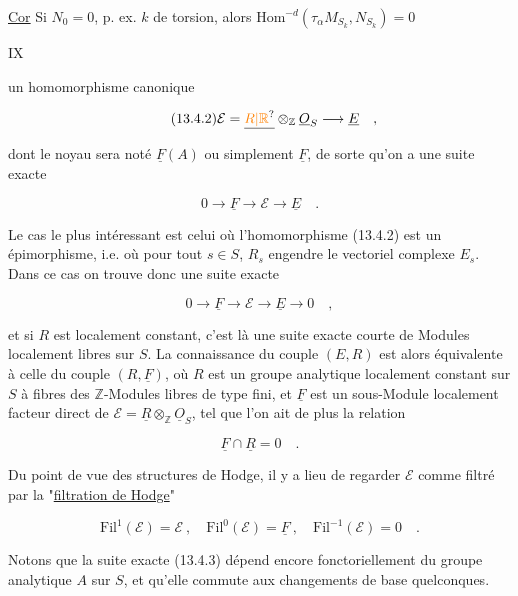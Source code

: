 \uline{Cor} Si $N_0=0$, p. ex. $k$ de torsion, alors $\mathrm{Hom}^{-d}(\tau_\alpha M_{S_k},N_{S_k})=0$


\hfill IX

un homomorphisme canonique

\[
\tag*{(13.4.2)}
\mathcal{E}=\underline{\unsure{R|\mathbb{R}}}\otimes_{\mathbb{Z}}\underline{O}_S\longrightarrow\underline{E}\quad ,
\]

dont le noyau sera noté $\underline{F}(A)$ ou simplement $\underline{F}$, de sorte qu'on a une suite exacte

\[
\tag*{(13.4.3)}
0\longrightarrow\underline{F}\longrightarrow\mathcal{E}\longrightarrow\underline{E}\quad .
\]

Le cas le plus intéressant est celui où l'homomorphisme (13.4.2) est un épimorphisme, i.e. où pour tout $s\in S$, $R_s$ engendre le vectoriel complexe $E_s$. Dans ce cas on trouve donc une suite exacte

\[
\tag*{(13.4.4)}
0\longrightarrow\underline{F}\longrightarrow\mathcal{E}\longrightarrow\underline{E}\longrightarrow0\quad ,
\]

et si $R$ est localement constant, c'est là une suite exacte courte de Modules localement libres sur $S$. La connaissance du couple $(E,R)$ est alors équivalente à celle du couple $(R,\underline{F})$, où $R$ est un groupe analytique localement constant sur $S$ à fibres des $\mathbb{Z}$-Modules libres de type fini, et $\underline{F}$ est un sous-Module localement facteur direct de $\mathcal{E}=\underline{R}\otimes_{\mathbb{Z}}\underline{O}_S$, tel que l'on ait de plus la relation

\[
\tag*{(13.4.5)}
\underline{F}\cap\underline{R}=0\quad .
\]

Du point de vue des structures de Hodge, il y a lieu de regarder $\mathcal{E}$ comme filtré par la "\uline{filtration de Hodge}"

\[
\tag*{(13.4.6)}
\mathrm{Fil}^{1}(\mathcal{E})=\mathcal{E}\ ,\quad \mathrm{Fil}^{0}(\mathcal{E})=\underline{F}\ ,\quad \mathrm{Fil}^{-1}(\mathcal{E})=0\quad .
\]

Notons que la suite exacte (13.4.3) dépend encore fonctoriellement du groupe analytique $A$ sur $S$, et qu'elle commute aux changements de base quelconques.



